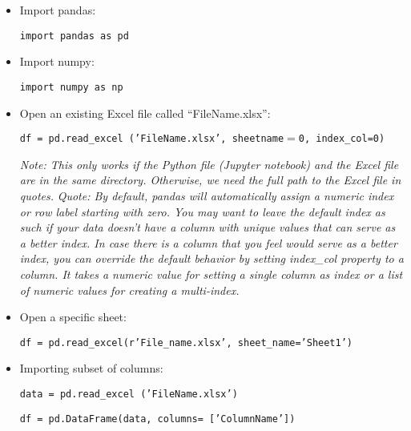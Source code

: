 \documentclass[11pt]{article}
\theoremstyle{definition}
\begin{document}
\begin{itemize}
\item  Import pandas:  \begin{center} \texttt{import pandas as pd} \end{center}
\item  Import numpy:  \begin{center} \texttt{import numpy as np} \end{center}
\item  Open an existing Excel file called ``FileName.xlsx'': \begin{center} \texttt{df = pd.read\_excel ('FileName.xlsx', sheetname$=$0, index\_col=0)} \end{center}
\emph{Note: This only works if the Python file (Jupyter notebook) and the Excel file are in the same directory.  Otherwise, we need the full path to the Excel file in quotes.}
\emph{Quote: By default, pandas will automatically assign a numeric index or row label starting with zero. You may want to leave the default index as such if your data doesn’t have a column with unique values that can serve as a better index. In case there is a column that you feel would serve as a better index, you can override the default behavior by setting index\_col property to a column. It takes a numeric value for setting a single column as index or a list of numeric values for creating a multi-index.}
\item Open a specific sheet: \begin{center} \texttt{df = pd.read\_excel(r'File\_name.xlsx', sheet\_name='Sheet1')}\end{center}

\item Importing subset of columns: \begin{center}\texttt{data = pd.read\_excel ('FileName.xlsx') }


\texttt{df = pd.DataFrame(data, columns= ['ColumnName'])}
\end{center}


\end{itemize}
\end{document}
